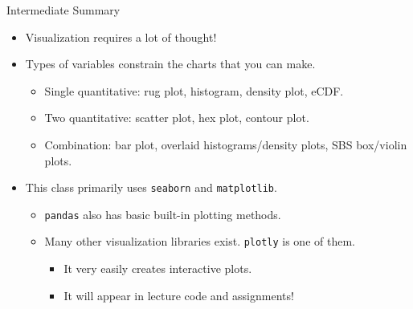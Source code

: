 \documentclass[aspectratio=169]{../latex_main/tntbeamer}  %
\begin{document}
	
	\begin{frame}{Intermediate Summary}
	    \begin{itemize}
	        \item Visualization requires a lot of thought!
	        \item Types of variables constrain the charts that you can make.
	        \begin{itemize}
	            \item Single quantitative: rug plot, histogram, density plot, eCDF.
	            \item Two quantitative: scatter plot, hex plot, contour plot.
	            \item Combination: bar plot, overlaid histograms/density plots, SBS box/violin plots.
	        \end{itemize}
	        \item This class primarily uses \texttt{seaborn} and \texttt{matplotlib}.
	        \begin{itemize}
	            \item \texttt{pandas} also has basic built-in plotting methods.
	            \item Many other visualization libraries exist. \texttt{plotly} is one of them.
	            \begin{itemize}
	                \item It very easily creates interactive plots.
	                \item It will appear in lecture code and assignments! 
	            \end{itemize}
	        \end{itemize}
	    \end{itemize}
	\end{frame}
	
	
	
\end{document}
